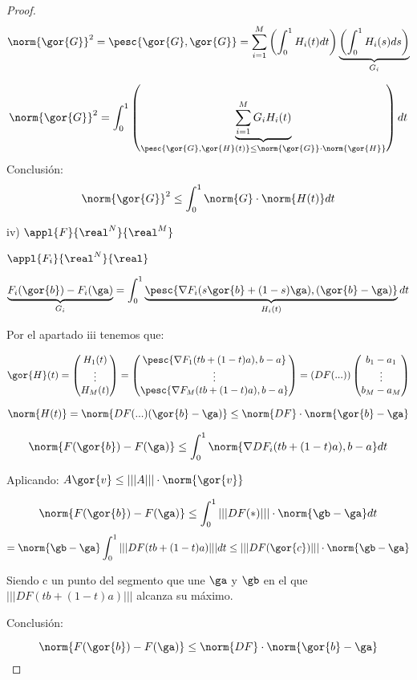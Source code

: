 \begin{itemize}
\begin{proof}
   
   $$\norm{\gor{G}}^2 = \pesc{\gor{G},\gor{G}} = \sum_{i=1}^M \left(\int_0^1 H_i(t)dt\right) \underbrace{\left(\int_0^1 H_i(s)ds\right)}_{G_i}$$
 
   $$\norm{\gor{G}}^2 = \displaystyle\int_0^1 \left(\underbrace{\sum_{i=1}^M G_i H_i (t)}_{\pesc{\gor{G},\gor{H}(t)}\leq \norm{\gor{G}}\cdot \norm{\gor{H}}}\right)dt$$
   Conclusión:
   $$\norm{\gor{G}}^2 \leq \displaystyle\int_0^1\norm{G}\cdot\norm{H(t)}dt$$
   
   iv) $\appl{F}{\real^N}{\real^M}$
   
   $\appl{F_i}{\real^N}{\real}$
   
   $\underbrace{F_i(\gor{b})-F_i(\ga)}_{G_i} = \displaystyle\int_0^1 \underbrace{\pesc{\nabla F_i (s\gor{b}+(1-s)\ga ),(\gor{b}-\ga)}}_{H_i(t)}dt$
   
   Por el apartado iii tenemos que:
   
   
   $$\gor{H}(t) = \begin{pmatrix}
                   H_1(t)\\
                   \vdots\\
                   H_M(t)
                  \end{pmatrix}
                = \begin{pmatrix}
                   \pesc{\nabla F_1(tb+(1-t)a),b-a}\\
                   \vdots\\
                   \pesc{\nabla F_M(tb+(1-t)a),b-a}
                  \end{pmatrix}
		= \left(DF(...)\right)\begin{pmatrix}
		                        b_1-a_1\\
		                        \vdots\\
		                        b_M-a_M
		                       \end{pmatrix}
$$

$$\norm{H(t)} = \norm{DF(...)(\gor{b}-\ga)} \leq \norm{DF}\cdot\norm{\gor{b}-\ga}$$


$$\norm{F(\gor{b})-F(\ga)} \leq \displaystyle\int_0^1 \norm{\nabla DF_i(tb+(1-t)a),b-a}dt$$

Aplicando: $A\gor{v} \leq |||A|||\cdot \norm{\gor{v}}$

$$\norm{F(\gor{b})-F(\ga)} \leq \displaystyle\int_0^1 |||DF(*)|||\cdot\norm{\gb-\ga}dt$$
$$= \norm{\gb - \ga} \displaystyle \int_0^1 |||DF(tb+(1-t)a)||| dt \leq |||DF(\gor{c})|||\cdot\norm{\gb-\ga}$$ 

Siendo c un punto del segmento que une $\ga$ y $\gb$ en el que $|||DF(tb+(1-t)a)|||$ alcanza su máximo.
   
Conclusión:

$$\norm{F(\gor{b})-F(\ga)} \leq \norm{DF}\cdot\norm{\gor{b}-\ga}$$
  \end{proof}

\end{itemize}

